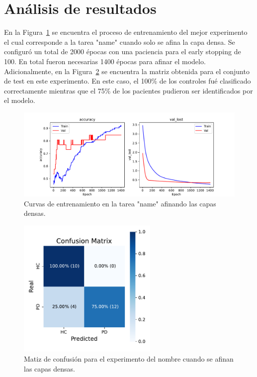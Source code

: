 \documentclass[10pt, a4paper]{article}
\begin{document}
\section*{Análisis de resultados}
En la Figura~\ref*{fig:History} se encuentra el proceso de entrenamiento del mejor experimento el
cual corresponde a la tarea "name" cuando solo se afina la capa densa. Se configuró un total de 2000
épocas con una paciencia para el early stopping de 100. En total fueron necesarias 1400 épocas para
afinar el modelo. Adicionalmente, en la Figura~\ref*{fig:cm} se encuentra la matriz obtenida para el
conjunto de test en este experimento. En este caso, el 100\% de los controles fué clasificado correctamente
mientras que el 75\% de los pacientes pudieron ser identificados por el modelo.

\begin{figure}[h!!]
    \centering
    \includegraphics[width=1\textwidth]{images/History_Name_Dense.pdf}
    \caption{Curvas de entrenamiento en la tarea "name" afinando las capas densas.}
    \label{fig:History}
\end{figure}

\begin{figure}[h!!]
    \centering
    \includegraphics[width=0.6\textwidth]{images/CM_Name_Dense.pdf}
    \caption{Matiz de confusión para el experimento del nombre cuando se afinan las capas densas.}
    \label{fig:cm}
\end{figure}
\end{document}
